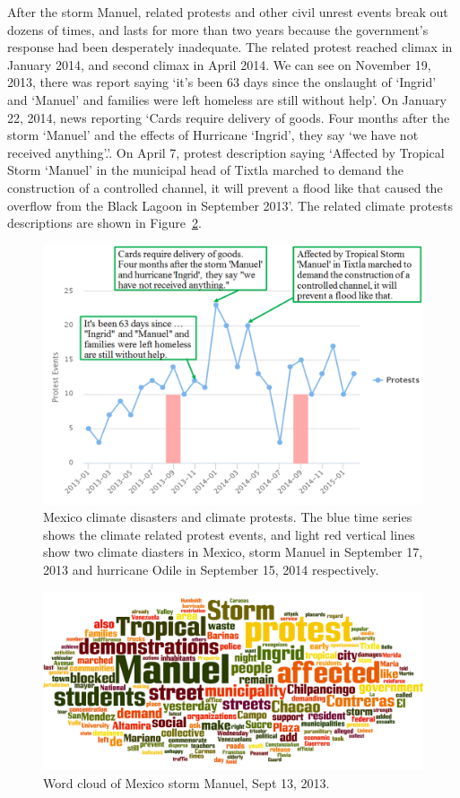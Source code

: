 \documentclass[9pt,twocolumn,twoside]{pnas-new}
\begin{document}
After the storm Manuel, related protests and other civil unrest events break out dozens of times, and lasts for more than two years because the government's response had been desperately inadequate. The related protest reached  climax in January 2014, and second climax in April 2014. We can see on November 19, 2013, there was report saying `it's been 63 days since the onslaught of `Ingrid' and `Manuel' and families were left homeless are still without help'. On January 22, 2014, news reporting `Cards require delivery of goods. Four months after the storm `Manuel' and the effects of Hurricane `Ingrid', they say `we have not received anything'.'. On April 7, protest description saying `Affected by Tropical Storm `Manuel' in the municipal head of Tixtla marched to demand the construction of a controlled channel, it will prevent a flood like that caused the overflow from the Black Lagoon in September 2013'. The related climate protests descriptions are shown in Figure~\ref{Manuel_word_cloud}.

\begin{figure}[ht]
\centerline
{\includegraphics[width=.35\textwidth]{figures/Mexico_disaster2}}
\caption{Mexico climate disasters and climate protests. The blue time series shows the climate related protest events, and light red vertical lines show two climate diasters in Mexico, storm Manuel in September 17, 2013 and hurricane Odile in September 15, 2014 respectively.}
\label{Mexico_disaster_timeseries}
\end{figure}


\begin{figure}[ht]
\centerline
{\includegraphics[width=.3\textwidth]{figures/Mexico_Manuel_wordcloud}}
\caption{Word cloud of Mexico storm Manuel, Sept 13, 2013.}
\label{Manuel_word_cloud}
\end{figure}
\end{document}
